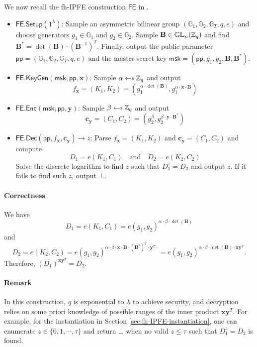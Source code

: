 We now recall the fh-IPFE construction $\textsf{FE}$ in \cite{cryptoeprint:2016/440}.

\begin{itemize}

	\item $\textsf{FE.Setup}(1^\lambda)$: Sample an asymmetric bilinear group $(\mathbb{G}_1, \mathbb{G}_2, \mathbb{G}_T, q, e)$ and choose generators $g_1 \in \mathbb{G}_1$ and $g_2 \in \mathbb{G}_2$. Sample $\mathbf{B} \in \mathbb{GL}_n(\mathbb{Z}_q)$ and find $\mathbf{B}^* = \det(\mathbf{B}) \cdot (\mathbf{B}^{-1})^T$. Finally, output the public parameter $\textsf{pp} = (\mathbb{G}_1, \mathbb{G}_2, \mathbb{G}_T, q, e)$ and the master secret key $\textsf{msk} = (\textsf{pp}, g_1, g_2, \mathbf{B}, \mathbf{B}^*)$.
	
	\item $\textsf{FE.KeyGen}(\textsf{msk}, \textsf{pp}, \mathbf{x})$: Sample $\alpha \getsdollar \Z_q$ and output
	\[
		 f_\mathbf{x} = (K_1, K_2) = \left( g_1^{\alpha \cdot \det(\mathbf{B})}, g_1^{\alpha \cdot \mathbf{x} \cdot \mathbf{B}} \right)
	\]
	
	\item $\textsf{FE.Enc}(\textsf{msk}, \textsf{pp}, \mathbf{y})$: Sample $\beta \getsdollar \Z_q$ and output
	\[
		 \mathbf{c_y} = (C_1, C_2) = \left( g_2^{\beta}, g_2^{\beta \cdot \mathbf{y} \cdot \mathbf{B}^*} \right)
	\]
	
	\item $\textsf{FE.Dec}(\textsf{pp}, f_\mathbf{x}, \mathbf{c_y}) \to z$: Parse $f_\mathbf{x} = (K_1, K_2)$ and $\mathbf{c_y} = (C_1, C_2)$ and compute 
	\[
		D_1 = e(K_1, C_1) \quad \text{and} \quad D_2 = e(K_2, C_2)
	\]
	Solve the discrete logarithm to find $z$ such that $D_1^z = D_2$ and output $z$. If it fails to find such $z$, output $\bot$.

\end{itemize}

\paragraph{Correctness}
We have
\[
	D_1 = e(K_1, C_1) = e(g_1, g_2)^{\alpha \cdot \beta \cdot \det(\mathbf{B})}
\] and 
\[
	D_2 = e(K_2, C_2) = e(g_1, g_2)^{\alpha \cdot \beta \cdot \mathbf{x} \cdot \mathbf{B} \cdot (\mathbf{B}^*)^T \cdot \mathbf{y}^T \cdot } = e(g_1, g_2)^{\alpha \cdot \beta \cdot \det(\mathbf{B}) \cdot \mathbf{x}\mathbf{y}^T }.
\]
Therefore, $(D_1)^{\mathbf{x}\mathbf{y}^T} = D_2$.

\paragraph{Remark}
In this construction, $q$ is exponential to $\lambda$ to achieve security, and decryption relies on some priori knowledge of possible ranges of the inner product $\mathbf{x} \mathbf{y}^T$. For example, for the instantiation in Section \ref{sec:fh-IPFE-instantiation}, one can enumerate $z \in \{0, 1, \cdots, \tau \}$ and return $\bot$ when no valid $z \leq \tau$ such that $D_1^z = D_2$ is found.

